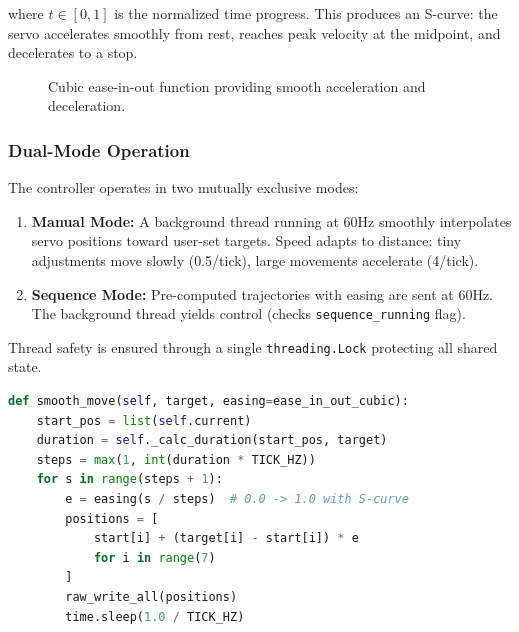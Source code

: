 \documentclass[12pt,a4paper]{article}
\begin{document}
where $t \in [0, 1]$ is the normalized time progress. This produces an S-curve: the servo accelerates smoothly from rest, reaches peak velocity at the midpoint, and decelerates to a stop.

\begin{figure}[H]
\centering
{}
\caption{Cubic ease-in-out function providing smooth acceleration and deceleration.}
\label{fig:easing}
\end{figure}

\subsubsection{Dual-Mode Operation}

The controller operates in two mutually exclusive modes:

\begin{enumerate}[leftmargin=2cm]
    \item \textbf{Manual Mode:} A background thread running at 60Hz smoothly interpolates servo positions toward user-set targets. Speed adapts to distance: tiny adjustments move slowly (0.5\textdegree/tick), large movements accelerate (4\textdegree/tick).
    \item \textbf{Sequence Mode:} Pre-computed trajectories with easing are sent at 60Hz. The background thread yields control (checks \texttt{sequence\_running} flag).
\end{enumerate}

Thread safety is ensured through a single \texttt{threading.Lock} protecting all shared state.

\begin{lstlisting}[language=Python, caption=Smooth move with easing interpolation]
def smooth_move(self, target, easing=ease_in_out_cubic):
    start_pos = list(self.current)
    duration = self._calc_duration(start_pos, target)
    steps = max(1, int(duration * TICK_HZ))
    for s in range(steps + 1):
        e = easing(s / steps)  # 0.0 -> 1.0 with S-curve
        positions = [
            start[i] + (target[i] - start[i]) * e
            for i in range(7)
        ]
        raw_write_all(positions)
        time.sleep(1.0 / TICK_HZ)
\end{lstlisting}
\end{document}
